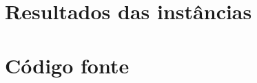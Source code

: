 \postextual
%

\printbibliography


\apendices


\chapter{Resultados das instâncias}\label{ch:resultados-das-instancias}



\chapter{Código fonte}\label{ch:codigo-fonte}


\anexos

